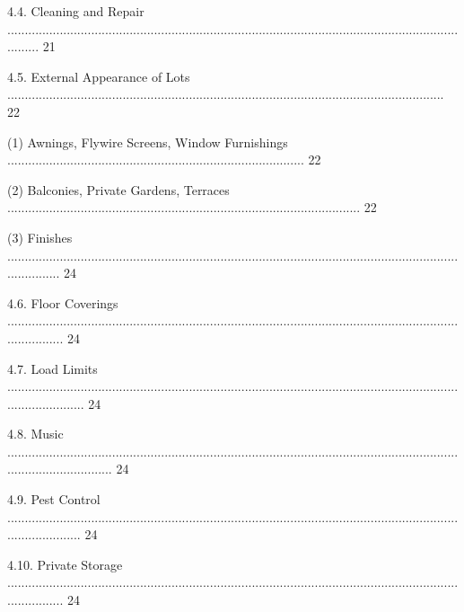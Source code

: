 \documentclass{article}
\begin{document}
{\fontsize{9.99}{1}4.4. Cleaning and Repair .......................................................................................................................................... 21 }

{\fontsize{9.99}{1}4.5. External Appearance of Lots ............................................................................................................................. 22 }

{\fontsize{9.962}{1}(1) Awnings, Flywire Screens, Window Furnishings ..................................................................................... 22 }

{\fontsize{9.962}{1}(2) Balconies, Private Gardens, Terraces ..................................................................................................... 22 }

{\fontsize{9.962}{1}(3) Finishes ................................................................................................................................................ 24 }

{\fontsize{9.99}{1}4.6. Floor Coverings ................................................................................................................................................. 24 }

{\fontsize{9.99}{1}4.7. Load Limits ....................................................................................................................................................... 24 }

{\fontsize{9.99}{1}4.8. Music ............................................................................................................................................................... 24 }

\newpage


















{\fontsize{9.99}{1}4.9. Pest Control ...................................................................................................................................................... 24 }

{\fontsize{9.99}{1}4.10. Private Storage ................................................................................................................................................. 24 }
\end{document}
